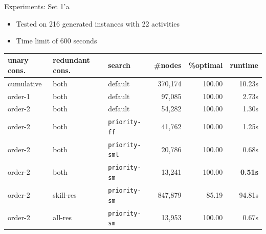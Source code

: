 \documentclass{beamer}
\begin{document}
\begin{frame}{Experiments: Set 1'a}
	\begin{itemize}
		\item Tested on 216 generated instances with 22 activities 
		\item Time limit of 600 seconds \pause
	\end{itemize}
	\begin{table}[tpb]
	\begin{adjustwidth}{-.9in}{-.9in}
    \centering
    \small
    \begin{tabular}{lllrrr}
        \toprule
        unary cons. & redundant cons. & search & \#nodes & \%optimal & runtime   \\
        \midrule
        cumulative & both & default & 370,174 & 100.00 & 10.23s \\
        order-1 & both & default & 97,085 & 100.00 & 2.73s \\
        order-2 & both & default & 54,282 & 100.00 & 1.30s \\
        \midrule\pause
        order-2 & both & {\tt priority-ff}    & 41,762 & 100.00 & 1.25s \\
        order-2 & both & {\tt priority-sml}    & 20,786 & 100.00 & 0.68s \\
        order-2 & both & {\tt priority-sm}    & 13,241 & 100.00 & {\color{red} {\bf 0.51s} }\\
        \midrule\pause
        order-2 & skill-res & {\tt priority-sm}    & 847,879 & 85.19 & 94.81s \\
        order-2 & all-res & {\tt priority-sm}    & 13,953 & 100.00 & 0.67s \\
        \bottomrule
    \end{tabular}
	\end{adjustwidth}
    \label{tab:resultsSet1a}
\end{table}
\end{frame}
\end{document}
